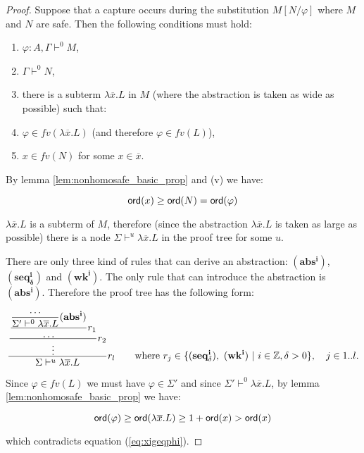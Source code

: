 \begin{proof}
Suppose that a capture occurs during the substitution $M[N/\varphi]$
where $M$ and $N$ are safe. Then the following conditions must hold:
\begin{enumerate}
\item $\varphi:A, \Gamma \vdash^0 M$,
\item $\Gamma \vdash^0 N$,
\item there is a subterm $\lambda \overline{x} . L$ in $M$ (where the abstraction is taken as wide as possible) such that:
\item $\varphi \in fv(\lambda \overline{x} . L)$ (and therefore $\varphi \in fv(L)$),
\item $x \in fv(N)$ for some $x \in \overline{x}$.
\end{enumerate}

By lemma \ref{lem:nonhomosafe_basic_prop} and (v) we have:

\begin{equation}
{\sf ord}(x) \geq {\sf ord}(N) = {\sf ord}(\varphi) \label{eq:xigeqphi}
\end{equation}

$\lambda \overline{x} . L$ is a subterm of $M$, therefore (since the
abstraction $\lambda \overline{x}.L$ is taken as large as possible)
there is a node $\Sigma \vdash^u \lambda \overline{x} . L$ in the
proof tree for some $u$.

There are only three kind of rules that can derive an abstraction:
$\mathbf{(abs^i)}$, $\mathbf{(seq^i_\delta)}$ and $\mathbf{(wk^i)}$.
The only rule that can introduce the abstraction is
$\mathbf{(abs^i)}$. Therefore the proof tree has the following form:

$$ \rulef{
    \rulef{
        \rulef{
            \rulef  {\ldots}
                   {\Sigma' \vdash^0 \lambda \overline{x} . L} \mathbf{(abs^i)}
        }
        {\ldots} r_1
    }
    {\vdots} r_2
    }
    { \Sigma \vdash^u \lambda \overline{x} . L } r_l
    \qquad \mbox{where } r_j \in \{ \mathbf{(seq^i_\delta)},\ \mathbf{(wk^i)}\ |\ i \in \zset, \delta > 0 \},
            \quad j\in 1..l.
$$


Since $\varphi \in fv (L)$ we must have $\varphi \in \Sigma'$ and
since $\Sigma' \vdash^0 \lambda \overline{x} . L$, by lemma
\ref{lem:nonhomosafe_basic_prop} we have:

$${\sf ord}(\varphi) \geq {\sf ord}(\lambda \overline{x} . L) \geq 1 + {\sf ord}(x) > {\sf ord}(x)$$

which contradicts equation (\ref{eq:xigeqphi}).
\end{proof}


